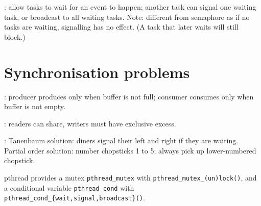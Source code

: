 \documentclass[fontsize=9pt]{slnotes}
\begin{document}
: allow tasks to wait for an event to happen; another task can signal one waiting task, or broadcast to all waiting tasks. Note: different from semaphore as if no tasks are waiting, signalling has no effect. (A task that later waits will still block.)

\section{Synchronisation problems}
: producer produces only when buffer is not full; consumer consumes only when buffer is not empty.

: readers can share, writers must have exclusive excess.

: Tanenbaum solution: diners signal their left and right if they are waiting. Partial order solution: number chopsticks 1 to 5; always pick up lower-numbered chopstick.

pthread provides a mutex \texttt{pthread\_mutex} with \texttt{pthread\-\_\-mutex\-\_\-(un)lock()}, and a conditional variable \texttt{pthread\_cond} with \texttt{pthread\-\_\-cond\-\_\-\{wait\-,\-signal\-,\-broadcast\}()}.
\end{document}
